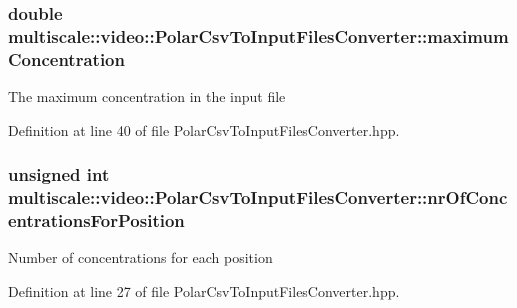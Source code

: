 \hypertarget{classmultiscale_1_1video_1_1PolarCsvToInputFilesConverter_a89b7dce2825cd5c8c45a1e6f19770e5f}{
\subsubsection[{maximum\-Concentration}]{\setlength{\rightskip}{0pt plus 5cm}double multiscale\-::video\-::\-Polar\-Csv\-To\-Input\-Files\-Converter\-::maximum\-Concentration\hspace{0.3cm}{\ttfamily [private]}}}\label{classmultiscale_1_1video_1_1PolarCsvToInputFilesConverter_a89b7dce2825cd5c8c45a1e6f19770e5f}
The maximum concentration in the input file 

Definition at line 40 of file Polar\-Csv\-To\-Input\-Files\-Converter.\-hpp.

\hypertarget{classmultiscale_1_1video_1_1PolarCsvToInputFilesConverter_a3a9301788514c50c295ca113a4114938}{
\subsubsection[{nr\-Of\-Concentrations\-For\-Position}]{\setlength{\rightskip}{0pt plus 5cm}unsigned int multiscale\-::video\-::\-Polar\-Csv\-To\-Input\-Files\-Converter\-::nr\-Of\-Concentrations\-For\-Position\hspace{0.3cm}{\ttfamily [private]}}}\label{classmultiscale_1_1video_1_1PolarCsvToInputFilesConverter_a3a9301788514c50c295ca113a4114938}
Number of concentrations for each position 

Definition at line 27 of file Polar\-Csv\-To\-Input\-Files\-Converter.\-hpp.

